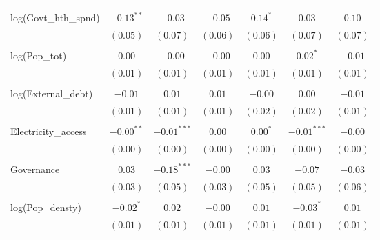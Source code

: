\begin{table}
\begin{center}
\begin{tabular}{l c c c c c c}
& & & & & & \\
log(Govt\_hth\_spnd)              & $-0.13^{**}$ & $-0.03$       & $-0.05$      & $0.14^{*}$   & $0.03$        & $0.10$       \\
                                     & $(0.05)$     & $(0.07)$      & $(0.06)$     & $(0.06)$     & $(0.07)$      & $(0.07)$     \\
& & & & & & \\
log(Pop\_tot)                        & $0.00$       & $-0.00$       & $-0.00$      & $0.00$       & $0.02^{*}$    & $-0.01$      \\
                                     & $(0.01)$     & $(0.01)$      & $(0.01)$     & $(0.01)$     & $(0.01)$      & $(0.01)$     \\
& & & & & & \\
log(External\_debt)           & $-0.01$      & $0.01$        & $0.01$       & $-0.00$      & $0.00$        & $-0.01$      \\
                                     & $(0.01)$     & $(0.01)$      & $(0.01)$     & $(0.02)$     & $(0.02)$      & $(0.01)$     \\
& & & & & & \\
Electricity\_access                                   & $-0.00^{**}$ & $-0.01^{***}$ & $0.00$       & $0.00^{*}$   & $-0.01^{***}$ & $-0.00$      \\
                                     & $(0.00)$     & $(0.00)$      & $(0.00)$     & $(0.00)$     & $(0.00)$      & $(0.00)$     \\
& & & & & & \\
Governance                                  & $0.03$       & $-0.18^{***}$ & $-0.00$      & $0.03$       & $-0.07$       & $-0.03$      \\
                                     & $(0.03)$     & $(0.05)$      & $(0.03)$     & $(0.05)$     & $(0.05)$      & $(0.06)$     \\
& & & & & & \\
log(Pop\_densty)                     & $-0.02^{*}$  & $0.02$        & $-0.00$      & $0.01$       & $-0.03^{*}$   & $0.01$       \\
                                     & $(0.01)$     & $(0.01)$      & $(0.01)$     & $(0.01)$     & $(0.01)$      & $(0.01)$     \\


\end{tabular}
\end{center}
\end{table}
